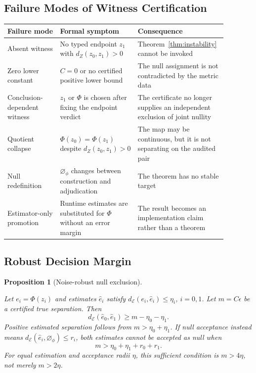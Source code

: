 \documentclass[11pt,a4paper]{article}
\theoremstyle{plain}
\newtheorem{proposition}[theorem]{Proposition}
\theoremstyle{definition}
\theoremstyle{remark}
\newcommand{\dE}{d_{\mathcal{E}}}
\newcommand{\nullphi}{\varnothing_\phi}
\begin{document}
\subsection{Failure Modes of Witness Certification}

\begin{center}
\begin{tabular}{|p{0.23\linewidth}|p{0.34\linewidth}|p{0.31\linewidth}|}
\hline
\textbf{Failure mode} & \textbf{Formal symptom} & \textbf{Consequence} \\
\hline
Absent witness & No typed endpoint $z_1$ with $d_Z(z_0,z_1)>0$ & Theorem~\ref{thm:instability} cannot be invoked \\
\hline
Zero lower constant & $C=0$ or no certified positive lower bound & The null assignment is not contradicted by the metric data \\
\hline
Conclusion-dependent witness & $z_1$ or $\Phi$ is chosen after fixing the endpoint verdict & The certificate no longer supplies an independent exclusion of joint nullity \\
\hline
Quotient collapse & $\Phi(z_0)=\Phi(z_1)$ despite $d_Z(z_0,z_1)>0$ & The map may be continuous, but it is not separating on the audited pair \\
\hline
Null redefinition & $\nullphi$ changes between construction and adjudication & The theorem has no stable target \\
\hline
Estimator-only promotion & Runtime estimates are substituted for $\Phi$ without an error margin & The result becomes an implementation claim rather than a theorem \\
\hline
\end{tabular}
\end{center}

\subsection{Robust Decision Margin}

\begin{proposition}[Noise-robust null exclusion]\label{prop:noise-margin}\leavevmode\par
Let $e_i=\Phi(z_i)$ and estimates $\widehat e_i$ satisfy $\dE(e_i,\widehat e_i)\leq\eta_i$, $i=0,1$. Let $m=C\epsilon$ be a certified true separation. Then
\[
\dE(\widehat e_0,\widehat e_1)\geq m-\eta_0-\eta_1.
\]
Positive estimated separation follows from $m>\eta_0+\eta_1$. If null acceptance instead means $\dE(\widehat e_i,\nullphi)\leq r_i$, both estimates cannot be accepted as null when
\[
m>\eta_0+\eta_1+r_0+r_1.
\]
For equal estimation and acceptance radii $\eta$, this sufficient condition is $m>4\eta$, not merely $m>2\eta$.
\end{proposition}
\end{document}
